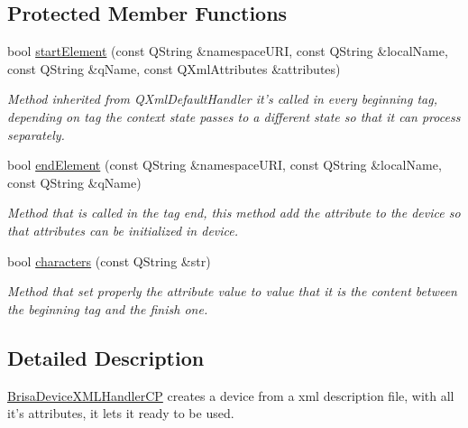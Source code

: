 \subsection*{Protected Member Functions}
\begin{DoxyCompactItemize}
\item 
bool \hyperlink{classBrisaUpnp_1_1BrisaDeviceXMLHandlerCP_a5918cfec2377b9dbea98eeaaaeb0febd}{startElement} (const QString \&namespaceURI, const QString \&localName, const QString \&qName, const QXmlAttributes \&attributes)
\begin{DoxyCompactList}\small\item\em Method inherited from QXmlDefaultHandler it's called in every beginning tag, depending on tag the context state passes to a different state so that it can process separately. \item\end{DoxyCompactList}\item 
bool \hyperlink{classBrisaUpnp_1_1BrisaDeviceXMLHandlerCP_a9dfef9aec628dea7aed0fa9307579d98}{endElement} (const QString \&namespaceURI, const QString \&localName, const QString \&qName)
\begin{DoxyCompactList}\small\item\em Method that is called in the tag end, this method add the attribute to the device so that attributes can be initialized in device. \item\end{DoxyCompactList}\item 
bool \hyperlink{classBrisaUpnp_1_1BrisaDeviceXMLHandlerCP_a2454d1df1b1f929bbdce76a5ece2b696}{characters} (const QString \&str)
\begin{DoxyCompactList}\small\item\em Method that set properly the attribute value to  value that it is the content between the beginning tag and the finish one. \item\end{DoxyCompactList}\end{DoxyCompactItemize}


\subsection{Detailed Description}
\hyperlink{classBrisaUpnp_1_1BrisaDeviceXMLHandlerCP}{BrisaDeviceXMLHandlerCP} creates a device from a xml description file, with all it's attributes, it lets it ready to be used. 

